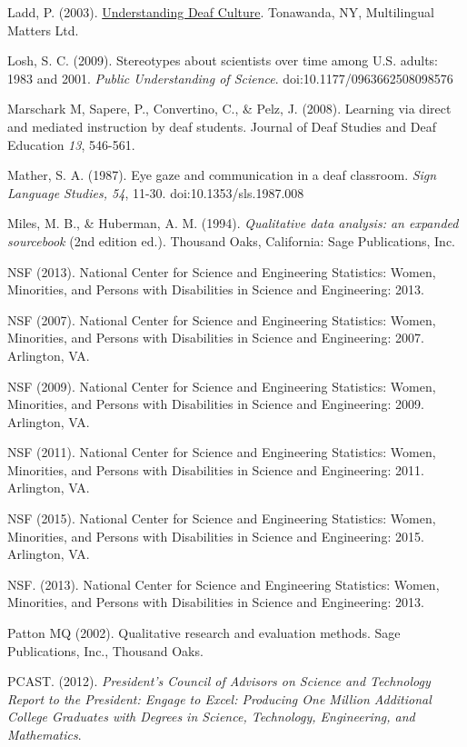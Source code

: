 \documentclass[11.5pt]{sig-alternate} %
\begin{document}
Ladd, P. (2003). \underline{Understanding Deaf Culture}. Tonawanda, NY, Multilingual Matters Ltd.

Losh, S. C. (2009). Stereotypes about scientists over time among U.S. adults: 1983 and 2001. \textit{Public Understanding of Science}. doi:10.1177/0963662508098576

Marschark M, Sapere, P., Convertino, C., \& Pelz, J. (2008). Learning via direct and mediated instruction by deaf students. Journal of Deaf Studies and Deaf Education  \textit{13}, 546-561.

Mather, S. A. (1987). Eye gaze and communication in a deaf classroom. \textit{Sign Language Studies, 54}, 11-30. doi:10.1353/sls.1987.008

Miles, M. B., \& Huberman, A. M. (1994). \textit{Qualitative data analysis: an expanded sourcebook} (2nd edition ed.). Thousand Oaks, California: Sage Publications, Inc.

NSF (2013). National Center for Science and Engineering Statistics: Women, Minorities, and Persons with Disabilities in Science and Engineering: 2013.

NSF (2007). National Center for Science and Engineering Statistics: Women, Minorities, and Persons with Disabilities in Science and Engineering: 2007. Arlington, VA.

NSF (2009). National Center for Science and Engineering Statistics: Women, Minorities, and Persons with Disabilities in Science and Engineering: 2009. Arlington, VA.

NSF (2011). National Center for Science and Engineering Statistics: Women, Minorities, and Persons with Disabilities in Science and Engineering: 2011. Arlington, VA.

NSF (2015). National Center for Science and Engineering Statistics: Women, Minorities, and Persons with Disabilities in Science and Engineering: 2015. Arlington, VA.

NSF. (2013). National Center for Science and Engineering Statistics: Women, Minorities, and Persons with Disabilities in Science and Engineering: 2013. 

Patton MQ (2002). Qualitative research and evaluation methods. Sage Publications, Inc., Thousand Oaks.

PCAST. (2012). \textit{President's Council of Advisors on Science and Technology Report to the President: Engage to Excel: Producing One Million Additional College Graduates with Degrees in Science, Technology, Engineering, and Mathematics}.  
\end{document}

